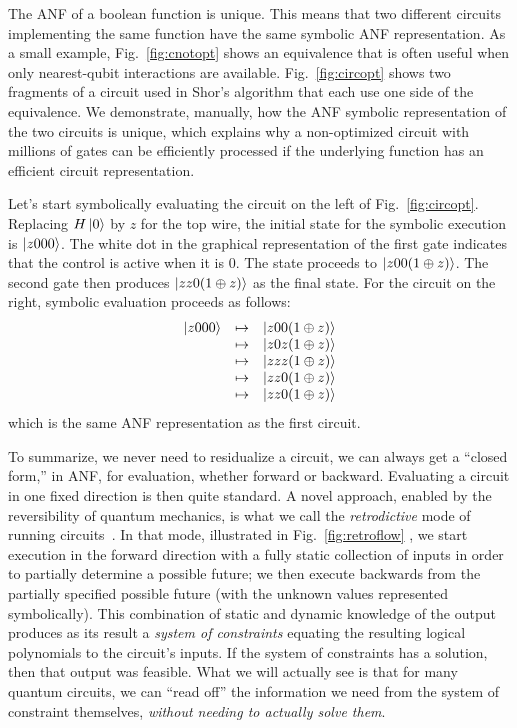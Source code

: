 \documentclass[sigplan,screen]{acmart}
\theoremstyle{definition}
\begin{document}
The ANF of a boolean function is unique. This means that two different
circuits implementing the same function have the same symbolic ANF
representation. As a small example, Fig.~\ref{fig:cnotopt} shows an
equivalence that is often useful when only nearest-qubit interactions
are available. Fig.~\ref{fig:circopt} shows two fragments of a circuit
used in Shor's algorithm that each use one side of the equivalence. We
demonstrate, manually, how the ANF symbolic representation of the two
circuits is unique, which explains why a non-optimized circuit with
millions of gates can be efficiently processed if the underlying
function has an efficient circuit representation.

Let's start symbolically evaluating the circuit on the left of
Fig.~\ref{fig:circopt}. Replacing $H\ket{0}$ by $z$ for the top wire, the
initial state for the symbolic execution is $\ket{z000}$.  The white
dot in the graphical representation of the first gate indicates that
the control is active when it is 0. The state proceeds to
$\ket{z00(1\oplus z)}$. The second gate then produces
$\ket{zz0(1\oplus z)}$ as the final state. For the circuit on the
right, symbolic evaluation proceeds as follows:
\[\begin{array}{rcl}
    \ket{z000}  &\mapsto& \ket{z00(1\oplus z)} \\
                &\mapsto& \ket{z0z(1\oplus z)} \\
                &\mapsto& \ket{zzz(1\oplus z)} \\
                &\mapsto& \ket{zz0(1\oplus z)} \\
                &\mapsto& \ket{zz0(1\oplus z)}
\end{array}\]
which is the same ANF representation as the first circuit.

To summarize, we never need to residualize a circuit, we can always
get a ``closed form,'' in ANF, for evaluation, whether forward or
backward. Evaluating a circuit in one fixed direction is then quite
standard. A novel approach, enabled by the reversibility of quantum
mechanics, is what we call the \emph{retrodictive} mode of running
circuits~\cite{retrodictive}. In that mode, illustrated in
Fig.~\ref{fig:retroflow} , we start execution in the forward direction
with a fully static collection of inputs in order to partially
determine a possible future; we then execute backwards from the
partially specified possible future (with the unknown values
represented symbolically). This combination of static and dynamic
knowledge of the output produces as its result a \emph{system of
constraints} equating the resulting logical polynomials to the
circuit's inputs. If the system of constraints has a solution, then
that output was feasible. What we will actually see is that for many
quantum circuits, we can ``read off'' the information we need from the
system of constraint themselves, \emph{without needing to actually
solve them}.
\end{document}
